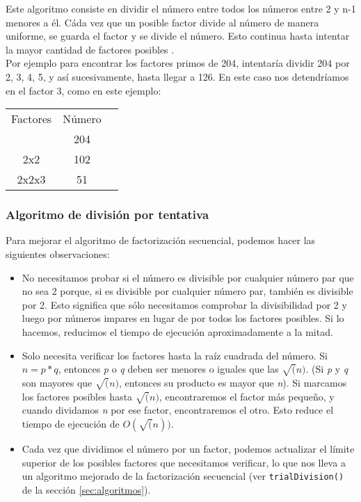 \documentclass{article}
\begin{document}
Este algoritmo consiste en dividir el número entre todos los números entre 2 y
n-1 menores a él. Cáda vez que un posible factor divide al número de manera
uniforme, se guarda el factor y se divide el número. Esto continua hasta
intentar la mayor cantidad de factores posibles \cite{stephens2019essential}.\\

Por ejemplo para encontrar los factores primos de 204, intentaría dividir 204
por 2, 3, 4, 5, y así sucesivamente, hasta llegar a 126. En este caso nos
detendríamos en el factor 3, como en este ejemplo:

\begin{center}
    \begin{tabular}{ c c c }
     Factores & Número \\ 
              & 204    \\
     2x2      & 102    \\
     2x2x3    & 51
    \end{tabular}
    \end{center}

\subsubsection{Algoritmo de división por tentativa}

Para mejorar el algoritmo de factorización secuencial, podemos hacer las
siguientes observaciones:

\begin{itemize}
    \item No necesitamos probar si el número es divisible por cualquier número par que
    no sea 2 porque, si es divisible por cualquier número par, también es divisible
    por 2. Esto significa que sólo necesitamos comprobar la divisibilidad por 2 y luego
    por números impares en lugar de por todos los factores posibles. Si lo hacemos,
    reducimos el tiempo de ejecución aproximadamente a la mitad.

    \item Solo necesita verificar los factores hasta la raíz cuadrada del número. Si
    $ n= p*q $, entonces \textit{p}  o \textit{q} deben ser menores o iguales
    que las $\sqrt(n)$. (Si \textit{p}  y \textit{q} son mayores que $\sqrt(n)$,
    entonces su producto es mayor que \textit{n}). Si marcamos los factores posibles
    hasta $\sqrt(n)$, encontraremos el factor más pequeño, y cuando dividamos
    \textit{n} por ese factor, encontraremos el otro. Esto reduce el tiempo de
    ejecución de $O(\sqrt(n))$.

    \item Cada vez que dividimos el número por un factor, podemos actualizar el
    límite superior de los posibles factores que necesitamos verificar, lo que nos
    lleva a un algoritmo mejorado de la factorización secuencial (ver
    \texttt{trialDivision()} de la sección \ref{sec:algoritmos}).

\end{itemize}
\end{document}
